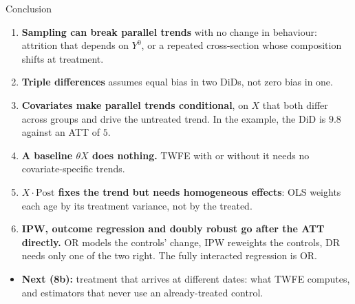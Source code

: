 \documentclass[
  11pt,
  ignorenonframetext,
  aspectratio=169,
]{beamer}
\providecommand{\tightlist}{%
  \setlength{\itemsep}{0pt}\setlength{\parskip}{0pt}}
\begin{document}
\begin{frame}{Conclusion}
\protect{}\label{conclusion}
\begin{enumerate}
\tightlist
\item
  \textbf{Sampling can break parallel trends} with no change in
  behaviour: attrition that depends on \(Y^0\), or a repeated
  cross-section whose composition shifts at treatment.
\item
  \textbf{Triple differences} assumes equal bias in two DiDs, not zero
  bias in one.
\item
  \textbf{Covariates make parallel trends conditional}, on \(X\) that
  both differ across groups and drive the untreated trend. In the
  example, the DiD is \(9.8\) against an ATT of \(5\).
\item
  \textbf{A baseline \(\theta X\) does nothing.} TWFE with or without it
  needs no covariate-specific trends.
\item
  \textbf{\(X \cdot \text{Post}\) fixes the trend but needs homogeneous
  effects}: OLS weights each age by its treatment variance, not by the
  treated.
\item
  \textbf{IPW, outcome regression and doubly robust go after the ATT
  directly.} OR models the controls' change, IPW reweights the controls,
  DR needs only one of the two right. The fully interacted regression is
  OR.
\end{enumerate}

\vspace{0.4em}

\begin{itemize}
\tightlist
\item
  \textbf{Next (8b):} treatment that arrives at different dates: what
  TWFE computes, and estimators that never use an already-treated
  control.
\end{itemize}
\end{frame}
\end{document}

